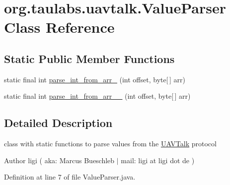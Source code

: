 \hypertarget{classorg_1_1taulabs_1_1uavtalk_1_1_value_parser}{\section{org.\-taulabs.\-uavtalk.\-Value\-Parser \-Class \-Reference}
\label{classorg_1_1taulabs_1_1uavtalk_1_1_value_parser}
}
\subsection*{\-Static \-Public \-Member \-Functions}
\begin{DoxyCompactItemize}
\item 
static final int \hyperlink{classorg_1_1taulabs_1_1uavtalk_1_1_value_parser_a6ac48b02167a5c46bb81b6472f187bd7}{parse\-\_\-int\-\_\-from\-\_\-arr\-\_} (int offset, byte\mbox{[}$\,$\mbox{]} arr)
\item 
static final int \hyperlink{classorg_1_1taulabs_1_1uavtalk_1_1_value_parser_a478c3605dbdc23b380cfdc8431a50f4e}{parse\-\_\-int\-\_\-from\-\_\-arr\-\_\-\_} (int offset, byte\mbox{[}$\,$\mbox{]} arr)
\end{DoxyCompactItemize}


\subsection{\-Detailed \-Description}
class with static functions to parse values from the \hyperlink{class_u_a_v_talk}{\-U\-A\-V\-Talk} protocol

\begin{DoxyAuthor}{\-Author}
ligi ( aka\-: \-Marcus \-Bueschleb $|$ mail\-: ligi at ligi dot de ) 
\end{DoxyAuthor}


\-Definition at line 7 of file \-Value\-Parser.\-java.



